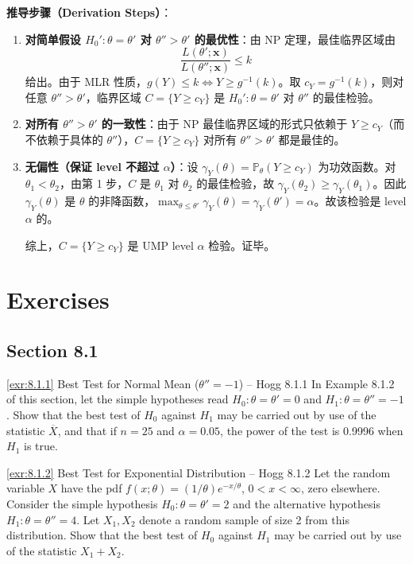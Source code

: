 \textbf{推导步骤（Derivation Steps）}：

\begin{enumerate}
\item \textbf{对简单假设 $H_0': \theta = \theta'$ 对 $\theta'' > \theta'$ 的最优性}：由 NP 定理，最佳临界区域由
\[
\frac{L(\theta';\mathbf{x})}{L(\theta'';\mathbf{x})} \leq k
\]
给出。由于 MLR 性质，$g(Y) \leq k \Longleftrightarrow Y \geq g^{-1}(k)$。取 $c_Y = g^{-1}(k)$，则对任意 $\theta'' > \theta'$，临界区域 $C = \{Y \geq c_Y\}$ 是 $H_0': \theta = \theta'$ 对 $\theta''$ 的最佳检验。

\item \textbf{对所有 $\theta'' > \theta'$ 的一致性}：由于 NP 最佳临界区域的形式只依赖于 $Y \geq c_Y$（而不依赖于具体的 $\theta''$），$C = \{Y \geq c_Y\}$ 对所有 $\theta'' > \theta'$ 都是最佳的。

\item \textbf{无偏性（保证 level 不超过 $\alpha$）}：设 $\gamma_Y(\theta) = \mathbb{P}_\theta(Y \geq c_Y)$ 为功效函数。对 $\theta_1 < \theta_2$，由第 1 步，$C$ 是 $\theta_1$ 对 $\theta_2$ 的最佳检验，故 $\gamma_Y(\theta_2) \geq \gamma_Y(\theta_1)$。因此 $\gamma_Y(\theta)$ 是 $\theta$ 的非降函数，$\max_{\theta \leq \theta'} \gamma_Y(\theta) = \gamma_Y(\theta') = \alpha$。故该检验是 level $\alpha$ 的。

综上，$C = \{Y \geq c_Y\}$ 是 UMP level $\alpha$ 检验。证毕。
\end{enumerate}

\section*{Exercises}\label{sec:exercises-ch8}

\subsection*{Section 8.1}

\begin{exercise}{\ref{exr:8.1.1} Best Test for Normal Mean ($\theta'' = -1$) -- Hogg 8.1.1}\label{exr:8.1.1}
In Example 8.1.2 of this section, let the simple hypotheses read $H_0: \theta = \theta' = 0$ and $H_1: \theta = \theta'' = -1$. Show that the best test of $H_0$ against $H_1$ may be carried out by use of the statistic $\overline{X}$, and that if $n = 25$ and $\alpha = 0.05$, the power of the test is 0.9996 when $H_1$ is true.
\end{exercise}

\begin{exercise}{\ref{exr:8.1.2} Best Test for Exponential Distribution -- Hogg 8.1.2}\label{exr:8.1.2}
Let the random variable $X$ have the pdf $f(x; \theta) = (1/\theta)e^{-x/\theta}$, $0 < x < \infty$, zero elsewhere. Consider the simple hypothesis $H_0: \theta = \theta' = 2$ and the alternative hypothesis $H_1: \theta = \theta'' = 4$. Let $X_1, X_2$ denote a random sample of size 2 from this distribution. Show that the best test of $H_0$ against $H_1$ may be carried out by use of the statistic $X_1 + X_2$.
\end{exercise}

